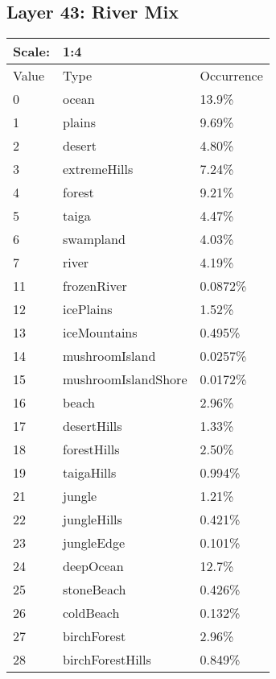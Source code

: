 \documentclass{article}
\begin{document}
	\subsection{Layer 43: River Mix}
	\begin{tabular}{|l|l|l|}\hline
		Scale: & \multicolumn{2}{|l|}{1:4} \\\hline\hline
		Value  & Type                & Occurrence \\\hline
		0      & ocean               & 13.9\%\\\hline
		1      & plains              & 9.69\%\\\hline
		2      & desert              & 4.80\%\\\hline
		3      & extremeHills        & 7.24\%\\\hline
		4      & forest              & 9.21\%\\\hline
		5      & taiga               & 4.47\%\\\hline
		6      & swampland           & 4.03\%\\\hline
		7      & river               & 4.19\%\\\hline
		11     & frozenRiver         & 0.0872\%\\\hline
		12     & icePlains           & 1.52\%\\\hline
		13     & iceMountains        & 0.495\%\\\hline
		14     & mushroomIsland      & 0.0257\%\\\hline
		15     & mushroomIslandShore & 0.0172\%\\\hline
		16     & beach               & 2.96\%\\\hline
		17     & desertHills         & 1.33\%\\\hline
		18     & forestHills         & 2.50\%\\\hline
		19     & taigaHills          & 0.994\%\\\hline
		21     & jungle              & 1.21\%\\\hline
		22     & jungleHills         & 0.421\%\\\hline
		23     & jungleEdge          & 0.101\%\\\hline
		24     & deepOcean           & 12.7\%\\\hline
		25     & stoneBeach          & 0.426\%\\\hline
		26     & coldBeach           & 0.132\%\\\hline
		27     & birchForest         & 2.96\%\\\hline
		28     & birchForestHills    & 0.849\%\\\hline

\end{tabular}
\end{document}
